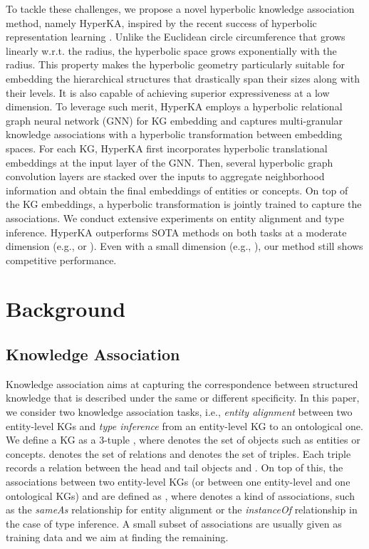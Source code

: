 \documentclass[11pt,a4paper]{article}
\newcommand{\modelname}{HyperKA\xspace}
\begin{document}
To tackle these challenges, we propose a novel hyperbolic knowledge association method, namely \modelname, inspired by the recent success of hyperbolic representation learning \cite{NickelK17,HyperText,HyperWord}. Unlike the Euclidean circle circumference that grows linearly w.r.t. the radius, the hyperbolic space grows exponentially with the radius. This property makes the hyperbolic geometry particularly suitable for embedding the hierarchical structures that drastically span their sizes along with their levels. It is also capable of achieving superior expressiveness at a low dimension. To leverage such merit, \modelname employs a hyperbolic relational graph neural network (GNN) for KG embedding and captures multi-granular knowledge associations with a hyperbolic transformation between embedding spaces. For each KG, \modelname first incorporates hyperbolic translational embeddings at the input layer of the GNN. Then, several hyperbolic graph convolution layers are stacked over the inputs to aggregate neighborhood information and obtain the final embeddings of entities or concepts. On top of the KG embeddings, a hyperbolic transformation is jointly trained to capture the associations. We conduct extensive experiments on entity alignment and type inference. \modelname outperforms SOTA methods on both tasks at a moderate dimension (e.g.,  or ). Even with a small dimension (e.g., ), our method still shows competitive performance.
 \section{Background}
\label{sect:related_work}


\subsection{Knowledge Association}
Knowledge association aims at capturing the correspondence between structured knowledge that is described under the same or different specificity. In this paper, we consider two knowledge association tasks, i.e., \emph{entity alignment} between two entity-level KGs and \emph{type inference} from an entity-level KG to an ontological one. We define a KG as a 3-tuple , where  denotes the set of objects such as entities or concepts.  denotes the set of relations and  denotes the set of triples. Each triple  records a relation  between the head and tail objects  and . On top of this, the associations between two entity-level KGs (or between one entity-level and one ontological KGs)  and  are defined as , where  denotes a kind of associations, such as the \textit{sameAs} relationship for entity alignment or the \textit{instanceOf} relationship in the case of type inference. A small subset of associations  are usually given as training data and we aim at finding the remaining.
\end{document}
